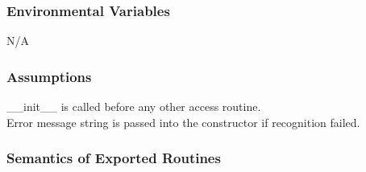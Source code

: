 \documentclass[11pt]{article}
\begin{document}
		
		\subsubsection{Environmental Variables}
		N/A
		
		\subsubsection{Assumptions}
		\_\_init\_\_ is called before any other access routine. \\
		Error message string is passed into the constructor if recognition failed.
		
		\subsubsection{Semantics of Exported Routines}
\end{document}
